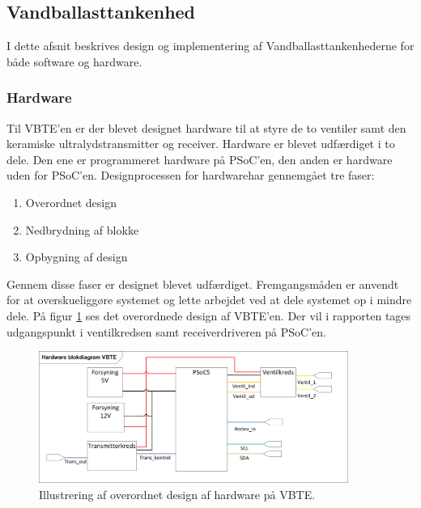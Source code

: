 \subsection{Vandballasttankenhed}
I dette afsnit beskrives design og implementering af Vandballasttankenhederne for både software og hardware. 
\subsubsection{Hardware}
Til VBTE'en er der blevet designet hardware til at styre de to ventiler samt den keramiske ultralydstransmitter og receiver. Hardware er blevet udfærdiget i to dele. Den ene er programmeret hardware på PSoC'en, den anden er hardware uden for PSoC'en. Designprocessen for hardwarehar gennemgået tre faser:
\begin{enumerate}
\item Overordnet design
\item Nedbrydning af blokke
\item Opbygning af design
\end{enumerate}
Gennem disse faser er designet blevet udfærdiget. Fremgangsmåden er anvendt for at overskueliggøre systemet og lette arbejdet ved at dele systemet op i mindre dele. På figur \ref{fig:HWVBTE} ses det overordnede design af VBTE'en. Der vil i rapporten tages udgangspunkt i ventilkredsen samt receiverdriveren på PSoC'en.
\begin{figure}[H]
\centering
\includegraphics[width = 0.9\textwidth]{billeder/HWVBTE}
\caption{Illustrering af overordnet design af hardware på VBTE.}
\label{fig:HWVBTE}
\end{figure}
